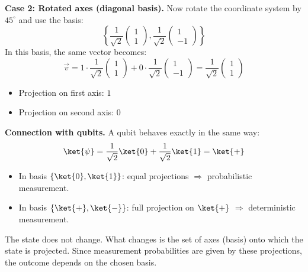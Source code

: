 \begin{examplebox}
    \highspace
    \textbf{Case 2: Rotated axes (diagonal basis).} Now rotate the coordinate system by $45^\circ$ and use the basis:
    \begin{equation*}
        \left\{
        \frac{1}{\sqrt{2}}\begin{pmatrix}1 \\ 1\end{pmatrix},
        \frac{1}{\sqrt{2}}\begin{pmatrix}1 \\ -1\end{pmatrix}
        \right\}
    \end{equation*}
    In this basis, the same vector becomes:
    \begin{equation*}
        \vec{v} = 1 \cdot \frac{1}{\sqrt{2}}\begin{pmatrix}1 \\ 1\end{pmatrix}
        + 0 \cdot \frac{1}{\sqrt{2}}\begin{pmatrix}1 \\ -1\end{pmatrix} = \frac{1}{\sqrt{2}}\begin{pmatrix}1 \\ 1\end{pmatrix}
    \end{equation*}
    \begin{itemize}
        \item Projection on first axis: $1$
        \item Projection on second axis: $0$
    \end{itemize}

    \highspace
    \textbf{Connection with qubits.} A qubit behaves exactly in the same way:
    \begin{equation*}
        \ket{\psi} = \frac{1}{\sqrt{2}}\ket{0} + \frac{1}{\sqrt{2}}\ket{1} = \ket{+}
    \end{equation*}
    \begin{itemize}
        \item In basis $\{\ket{0}, \ket{1}\}$: equal projections $\Rightarrow$ probabilistic measurement.
        \item In basis $\{\ket{+}, \ket{-}\}$: full projection on $\ket{+}$ $\Rightarrow$ deterministic measurement.
    \end{itemize}
    \textcolor{Green3}{} The state does not change. What changes is the set of axes (basis) onto which the state is projected. Since measurement probabilities are given by these projections, the outcome depends on the chosen basis.
\end{examplebox}


